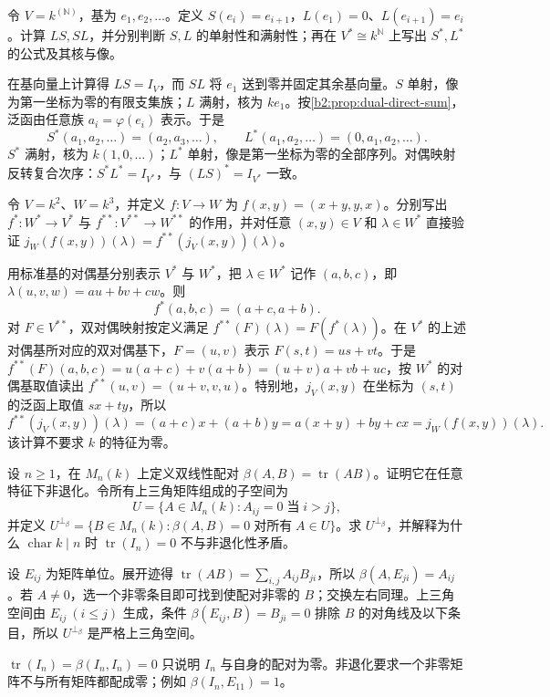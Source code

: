 \begin{exercise}\label{b2:ex:01-shift-dual}
	令 \(V=k^{(\mathbb N)}\)，基为 \(e_1,e_2,\ldots\)。定义 \(S(e_i)=e_{i+1}\)，\(L(e_1)=0\)、\(L(e_{i+1})=e_i\)。计算 \(LS,SL\)，并分别判断 \(S,L\) 的单射性和满射性；再在 \(V^*\cong k^{\mathbb N}\) 上写出 \(S^*,L^*\) 的公式及其核与像。
\end{exercise}
\begin{solution}
	在基向量上计算得 \(LS=I_V\)，而 \(SL\) 将 \(e_1\) 送到零并固定其余基向量。\(S\) 单射，像为第一坐标为零的有限支集族；\(L\) 满射，核为 \(ke_1\)。按\cref{b2:prop:dual-direct-sum}，泛函由任意族 \(a_i=\varphi(e_i)\) 表示。于是
	\[
		S^*(a_1,a_2,\ldots)=(a_2,a_3,\ldots),\qquad L^*(a_1,a_2,\ldots)=(0,a_1,a_2,\ldots).
	\]
	\(S^*\) 满射，核为 \(k(1,0,\ldots)\)；\(L^*\) 单射，像是第一坐标为零的全部序列。对偶映射反转复合次序：\(S^*L^*=I_{V^*}\)，与 \((LS)^*=I_{V^*}\) 一致。
\end{solution}

\begin{exercise}\label{b2:ex:01-double-dual-concrete}
	令 \(V=k^2\)、\(W=k^3\)，并定义 \(f:V\to W\) 为 \(f(x,y)=(x+y,y,x)\)。分别写出 \(f^*:W^*\to V^*\) 与 \(f^{**}:V^{**}\to W^{**}\) 的作用，并对任意 \((x,y)\in V\) 和 \(\lambda\in W^*\) 直接验证 \(j_W(f(x,y))(\lambda)=f^{**}(j_V(x,y))(\lambda)\)。
\end{exercise}
\begin{solution}
	用标准基的对偶基分别表示 \(V^*\) 与 \(W^*\)，把 \(\lambda\in W^*\) 记作 \((a,b,c)\)，即 \(\lambda(u,v,w)=au+bv+cw\)。则
	\[
		f^*(a,b,c)=(a+c,a+b).
	\]
	对 \(F\in V^{**}\)，双对偶映射按定义满足 \(f^{**}(F)(\lambda)=F(f^*(\lambda))\)。在 \(V^*\) 的上述对偶基所对应的双对偶基下，\(F=(u,v)\) 表示 \(F(s,t)=us+vt\)。于是 \(f^{**}(F)(a,b,c)=u(a+c)+v(a+b)=(u+v)a+vb+uc\)，按 \(W^*\) 的对偶基取值读出 \(f^{**}(u,v)=(u+v,v,u)\)。特别地，\(j_V(x,y)\) 在坐标为 \((s,t)\) 的泛函上取值 \(sx+ty\)，所以
	\[
		f^{**}(j_V(x,y))(\lambda)=(a+c)x+(a+b)y =a(x+y)+by+cx=j_W(f(x,y))(\lambda).
	\]
	该计算不要求 \(k\) 的特征为零。
\end{solution}

\begin{exercise}\label{b2:ex:01-trace-pairing}
	设 \(n\ge1\)，在 \(M_n(k)\) 上定义双线性配对 \(\beta(A,B)=\operatorname{tr}(AB)\)。证明它在任意特征下非退化。令所有上三角矩阵组成的子空间为
	\[
		U=\{A\in M_n(k):A_{ij}=0\;\text{当}\;i>j\},
	\]
	并定义 \(U^{\perp_\beta}=\{B\in M_n(k):\beta(A,B)=0\;\text{对所有}\;A\in U\}\)。求 \(U^{\perp_\beta}\)，并解释为什么 \(\operatorname{char}k\mid n\) 时 \(\operatorname{tr}(I_n)=0\) 不与非退化性矛盾。
\end{exercise}
\begin{solution}
	设 \(E_{ij}\) 为矩阵单位。展开迹得 \(\operatorname{tr}(AB)=\sum_{i,j}A_{ij}B_{ji}\)，所以 \(\beta(A,E_{ji})=A_{ij}\)。若 \(A\ne0\)，选一个非零条目即可找到使配对非零的 \(B\)；交换左右同理。上三角空间由 \(E_{ij}\ (i\le j)\) 生成，条件 \(\beta(E_{ij},B)=B_{ji}=0\) 排除 \(B\) 的对角线及以下条目，所以 \(U^{\perp_\beta}\) 是严格上三角空间。

	\(\operatorname{tr}(I_n)=\beta(I_n,I_n)=0\) 只说明 \(I_n\) 与自身的配对为零。非退化要求一个非零矩阵不与所有矩阵都配成零；例如 \(\beta(I_n,E_{11})=1\)。
\end{solution}

